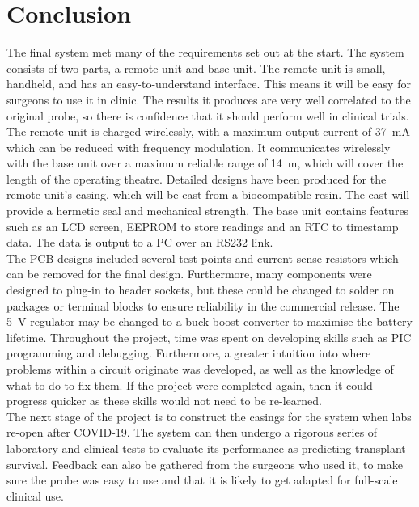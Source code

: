 \section{Conclusion}
The final system met many of the requirements set out at the start. The system consists of two parts, a remote unit and base unit. The remote unit is small, handheld, and has an easy-to-understand interface. This means it will be easy for surgeons to use it in clinic. The results it produces are very well correlated to the original probe, so there is confidence that it should perform well in clinical trials. The remote unit is charged wirelessly, with a maximum output current of \SI{37}{\milli\ampere} which can be reduced with frequency modulation. It communicates wirelessly with the base unit over a maximum reliable range of \SI{14}{\metre}, which will cover the length of the operating theatre. Detailed designs have been produced for the remote unit's casing, which will be cast from a biocompatible resin. The cast will provide a hermetic seal and mechanical strength. The base unit contains features such as an LCD screen, EEPROM to store readings and an RTC to timestamp data. The data is output to a PC over an RS232 link.\\

The PCB designs included several test points and current sense resistors which can be removed for the final design. Furthermore, many components were designed to plug-in to header sockets, but these could be changed to solder on packages or terminal blocks to ensure reliability in the commercial release. The \SI{5}{\volt} regulator may be changed to a buck-boost converter to maximise the battery lifetime. Throughout the project, time was spent on developing skills such as PIC programming and debugging. Furthermore, a greater intuition into where problems within a circuit originate was developed, as well as the knowledge of what to do to fix them. If the project were completed again, then it could progress quicker as these skills would not need to be re-learned. \\

The next stage of the project is to construct the casings for the system when labs re-open after COVID-19. The system can then undergo a rigorous series of laboratory and clinical tests to evaluate its performance as predicting transplant survival. Feedback can also be gathered from the surgeons who used it, to make sure the probe was easy to use and that it is likely to get adapted for full-scale clinical use.\\